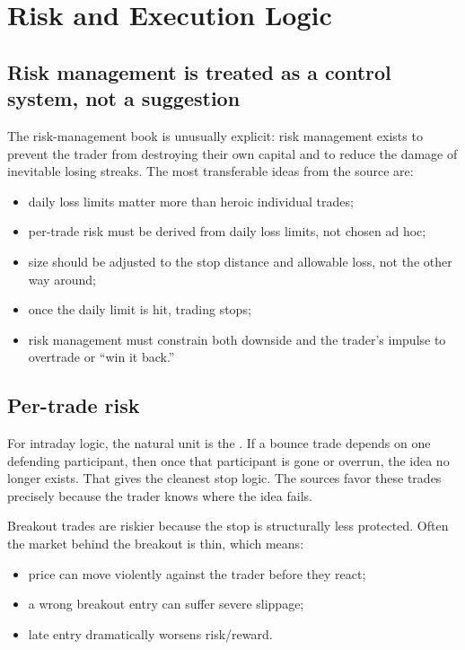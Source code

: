 \section{Risk and Execution Logic}

\subsection{Risk management is treated as a control system, not a suggestion}

The risk-management book is unusually explicit: risk management exists to prevent the trader from destroying their own capital and to reduce the damage of inevitable losing streaks. The most transferable ideas from the source are:

\begin{itemize}[leftmargin=1.5em]
\item daily loss limits matter more than heroic individual trades;
\item per-trade risk must be derived from daily loss limits, not chosen ad hoc;
\item size should be adjusted to the stop distance and allowable loss, not the other way around;
\item once the daily limit is hit, trading stops;
\item risk management must constrain both downside and the trader's impulse to overtrade or ``win it back.''
\end{itemize}

\subsection{Per-trade risk}

For intraday logic, the natural unit is the . If a bounce trade depends on one defending participant, then once that participant is gone or overrun, the idea no longer exists. That gives the cleanest stop logic. The sources favor these trades precisely because the trader knows where the idea fails.

Breakout trades are riskier because the stop is structurally less protected. Often the market behind the breakout is thin, which means:

\begin{itemize}[leftmargin=1.5em]
\item price can move violently against the trader before they react;
\item a wrong breakout entry can suffer severe slippage;
\item late entry dramatically worsens risk/reward.
\end{itemize}

